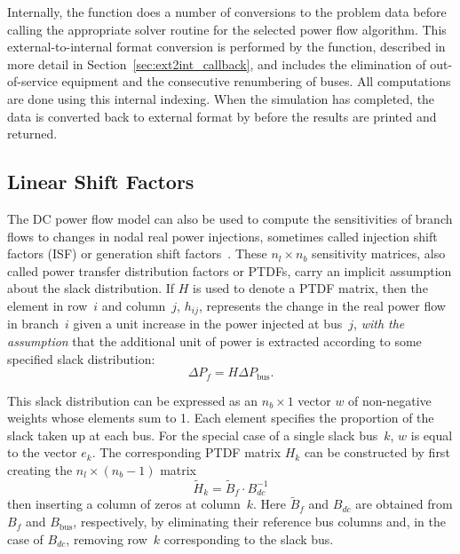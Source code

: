 \documentclass[12pt]{article}
\newcommand{\code}[1]{{\relsize{-0.5}{\tt{{#1}}}}}  %
\numberwithin{equation}{section}
\numberwithin{table}{section}
\numberwithin{figure}{section}
\begin{document}
Internally, the \code{runpf} function does a number of conversions to the problem data before calling the appropriate solver routine for the selected power flow algorithm. This external-to-internal format conversion is performed by the \code{ext2int} function, described in more detail in Section~\ref{sec:ext2int_callback}, and includes the elimination of out-of-service equipment and the consecutive renumbering of buses. All computations are done using this internal indexing. When the simulation has completed, the data is converted back to external format by \code{int2ext} before the results are printed and returned.

\subsection{Linear Shift Factors}
\label{sec:lsf}

The DC power flow model can also be used to compute the sensitivities of branch flows to changes in nodal real power injections, sometimes called injection shift factors (ISF) or generation shift factors~\cite{wood1996}. These $n_l \times n_b$ sensitivity matrices, also called power transfer distribution factors or PTDFs, carry an implicit assumption about the slack distribution. If $H$ is used to denote a PTDF matrix, then the element in row~$i$ and column~$j$, $h_{ij}$, represents the change in the real power flow in branch~$i$ given a unit increase in the power injected at bus~$j$, \emph{with the assumption} that the additional unit of power is extracted according to some specified slack distribution:
\begin{equation}
\Delta P_f = H \Delta P_\mathrm{bus}.
\end{equation}

This slack distribution can be expressed as an $n_b \times 1$ vector $w$ of non-negative weights whose elements sum to 1. Each element specifies the proportion of the slack taken up at each bus. For the special case of a single slack bus~$k$, $w$ is equal to the vector $e_k$. The corresponding PTDF matrix $H_k$ can be constructed by first creating the $n_l \times (n_b-1)$ matrix
\begin{equation}
\widetilde{H}_k = \widetilde{B}_f \cdot B_{dc}^{-1}
\end{equation}
then inserting a column of zeros at column~$k$. Here $\widetilde B_f$ and $B_{dc}$ are obtained from $B_f$ and $B_\mathrm{bus}$, respectively, by eliminating their reference bus columns and, in the case of $B_{dc}$, removing row~$k$ corresponding to the slack bus.
\end{document}
